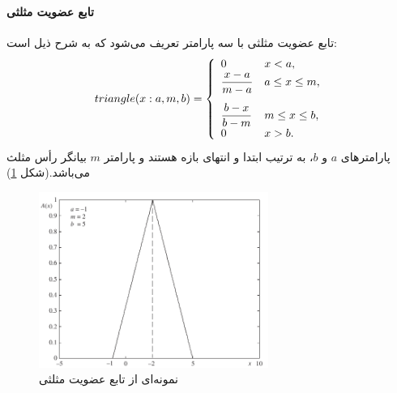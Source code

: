 \documentclass[12pt,a4paper]{article}
\theoremstyle{definition}
\begin{document}
 \paragraph{تابع عضویت مثلثی}
 تابع عضویت مثلثی
  با سه پارامتر تعریف می‌شود که به شرح ذیل است:
 \begin{equation}\label{eq:e_fset_memfunc_triangle}
 triangle (x: a, m, b) = \left\{ 
 \begin{array}{ll}
 0 &  x < a, \\ \vspace{0.3cm}
\mathlarger{\frac{x-a}{m-a}} & a \leq x \leq m, \\ 
\mathlarger{ \frac{b-x}{b-m}} & m \leq x \leq b, \\
 0 & x > b.
 \end{array}
 \right.
 \end{equation}
پارامترهای $a$ و $b$، به ترتیب ابتدا و انتهای بازه هستند و پارامتر $m$ بیانگر رأس مثلث می‌باشد.(شکل \ref{fig:f_14})
\cite{Pedrycz2007}
\begin{figure}[h]
	\centering 
	\includegraphics[width=75mm]{Images/Fig14.png}
	\vspace{-0.5cm}
	\caption{نمونه‌ای از تابع عضویت مثلثی}\label{fig:f_14}
\end{figure}
\end{document}
